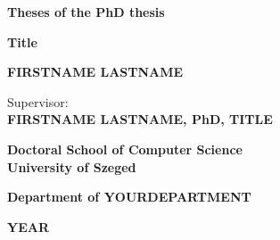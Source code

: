 
 \thispagestyle{empty}

 \begin{center}

 \vspace*{2em}

 \large \textbf{Theses of the PhD thesis}
 \vspace*{4em}

 \LARGE \textbf{Title}
 
 \vspace*{4em}
  
 \Large \textbf{FIRSTNAME LASTNAME}

 \vspace*{4em}


 {\large Supervisor: \\ \textbf{FIRSTNAME LASTNAME, PhD, TITLE} }
 

 
 \vspace*{4em}
 \large \textbf{ Doctoral School of Computer Science\\University of Szeged}
 
  \vspace*{1em}
 
 \large \textbf{ Department of YOURDEPARTMENT} 

 \vfill

 \large \textbf{YEAR}

 \end{center}
 
